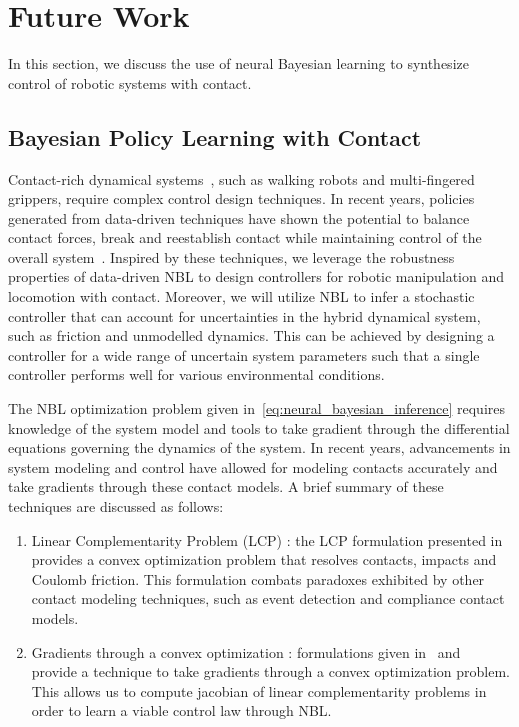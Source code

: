 \chapter{Future Work}

In this section, we discuss the use of neural Bayesian learning to synthesize
control of robotic systems with contact. 

\section{Bayesian Policy Learning with Contact}

Contact-rich dynamical systems~\cite{bhounsule2016dead,
sirichotiyakul2019energetically, ashenafi2021nonholonomic}, such as walking
robots and multi-fingered grippers, require complex control design techniques.
In recent years, policies generated from data-driven techniques have shown the
potential to balance contact forces, break and reestablish contact while
maintaining control of the overall system~\cite{nagabandi2020deep}. Inspired by
these techniques, we leverage the robustness properties of data-driven NBL to
design controllers for robotic manipulation and locomotion with contact.
Moreover, we will utilize NBL to infer a stochastic controller that can account
for uncertainties in the hybrid dynamical system, such as friction and
unmodelled dynamics. This can be achieved by designing a controller for a wide
range of uncertain system parameters such that a single controller performs well
for various environmental conditions.

The NBL optimization problem given in~\eqref{eq:neural_bayesian_inference}
requires knowledge of the system model and tools to take gradient through the
differential equations governing the dynamics of the system. In recent years,
advancements in system modeling and control have allowed for modeling contacts
accurately and take gradients through these contact models. A brief summary of
these techniques are discussed as follows:

\begin{enumerate}
    \item Linear Complementarity Problem (LCP) : the LCP formulation presented
    in~\cite{glocker2005formulation} provides a convex optimization problem that
    resolves contacts, impacts and Coulomb friction. This formulation combats
    paradoxes exhibited by other contact modeling techniques, such as event
    detection and compliance contact models.
    \item Gradients through a convex optimization : formulations given
    in~\cite{de2018end} and~\cite{amos2019differentiable} provide a technique to
    take gradients through a convex optimization problem. This allows us to
    compute jacobian of linear complementarity problems in order to learn a
    viable control law through NBL.
\end{enumerate}

